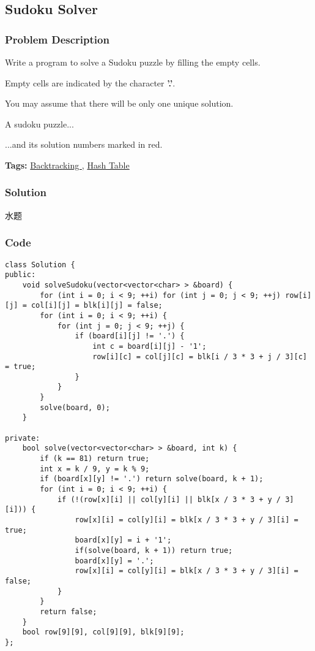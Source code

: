 \documentclass{article}
\begin{document}
\begin{CJK*}{UTF8}{gkai}
\begin{lstlisting}
\end{lstlisting}


\subsection{ Sudoku Solver }
\label{ Sudoku Solver }

\subsubsection*{Problem Description}
Write a program to solve a Sudoku puzzle by filling the empty cells.

Empty cells are indicated by the character \textbf{'.'}.

You may assume that there will be only one unique solution.





A sudoku puzzle...

...and its solution numbers marked in red.


\textbf{Tags: }
\hyperref[ Backtracking ]{ Backtracking },  \hyperref[ Hash Table ]{ Hash Table }



\subsubsection*{Solution}
水题

\subsubsection*{Code}
\begin{lstlisting}
class Solution {
public:
    void solveSudoku(vector<vector<char> > &board) {
        for (int i = 0; i < 9; ++i) for (int j = 0; j < 9; ++j) row[i][j] = col[i][j] = blk[i][j] = false;
        for (int i = 0; i < 9; ++i) {
            for (int j = 0; j < 9; ++j) {
                if (board[i][j] != '.') {
                    int c = board[i][j] - '1';
                    row[i][c] = col[j][c] = blk[i / 3 * 3 + j / 3][c] = true;
                }
            }
        }
        solve(board, 0);
    }
    
private:
    bool solve(vector<vector<char> > &board, int k) {
        if (k == 81) return true;
        int x = k / 9, y = k % 9;
        if (board[x][y] != '.') return solve(board, k + 1);
        for (int i = 0; i < 9; ++i) {
            if (!(row[x][i] || col[y][i] || blk[x / 3 * 3 + y / 3][i])) {
                row[x][i] = col[y][i] = blk[x / 3 * 3 + y / 3][i] = true;
                board[x][y] = i + '1';
                if(solve(board, k + 1)) return true;
                board[x][y] = '.';
                row[x][i] = col[y][i] = blk[x / 3 * 3 + y / 3][i] = false;
            }
        }
        return false;
    }
    bool row[9][9], col[9][9], blk[9][9];
}; 
\end{lstlisting}



\end{CJK*}
\end{document}
